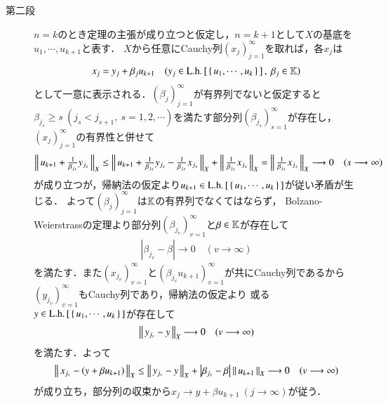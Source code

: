 \begin{prf}
\begin{description}
			\item[第二段]
				$n=k$のとき定理の主張が成り立つと仮定し，$n = k+1$として$X$の基底を$u_1,\cdots,u_{k+1}$と表す．
				$X$から任意にCauchy列$(x_j)_{j=1}^{\infty}$を取れば，各$x_j$は
				\begin{align}
					x_j = y_j + \beta_j u_{k+1} \quad (y_j \in \mathrm{L.h.}\left[\, \left\{\, u_1,\cdots,u_k\, \right\}\, \right],\ \beta_j \in \mathbb{K})
				\end{align}
				として一意に表示される．$(\beta_j)_{j=1}^{\infty}$が有界列でないと仮定すると
				$\beta_{j_s} \geq s\ (j_s < j_{s+1},\ s=1,2,\cdots)$を満たす部分列$\left( \beta_{j_s} \right)_{s=1}^{\infty}$が存在し，
				$(x_j)_{j=1}^{\infty}$の有界性と併せて
				\begin{align}
					\left\|\, u_{k+1} + \tfrac{1}{\beta_{j_s}}y_{j_s}\, \right\|_{X}
					\leq \left\|\, u_{k+1} + \tfrac{1}{\beta_{j_s}}y_{j_s} - \tfrac{1}{\beta_{j_s}}x_{j_s}\, \right\|_{X}
						+ \left\|\, \tfrac{1}{\beta_{j_s}}x_{j_s}\, \right\|_{X}
					= \left\|\, \tfrac{1}{\beta_{j_s}}x_{j_s}\, \right\|_{X} \longrightarrow 0 \quad (s \longrightarrow \infty)
				\end{align}
				が成り立つが，帰納法の仮定より$u_{k+1} \in \mathrm{L.h.}\left[\, \left\{\, u_1,\cdots,u_k\, \right\}\, \right]$が従い矛盾が生じる．
				よって$(\beta_j)_{j=1}^{\infty}$は$\mathbb{K}$の有界列でなくてはならず，
				Bolzano-Weierstrassの定理より部分列$\left( \beta_{j_v} \right)_{v=1}^{\infty}$と$\beta \in \mathbb{K}$が存在して
				\begin{align}
					\left| \beta_{j_v} - \beta \right| \longrightarrow 0 \quad (v \longrightarrow \infty)
				\end{align}
				を満たす．また$\left( x_{j_v} \right)_{v=1}^{\infty}$と$\left( \beta_{j_v} u_{k+1} \right)_{v=1}^{\infty}$が共にCauchy列であるから
				$\left( y_{j_v} \right)_{v=1}^{\infty}$もCauchy列であり，帰納法の仮定より
				或る$y \in \mathrm{L.h.}\left[\, \left\{\, u_1,\cdots,u_k\, \right\}\, \right]$が存在して
				\begin{align}
					\left\|\, y_{j_v} - y\, \right\|_{X} \longrightarrow 0 \quad (v \longrightarrow \infty)
				\end{align}
				を満たす．よって
				\begin{align}
					\left\|\, x_{j_v} - \left(y + \beta u_{k+1}\right)\, \right\|_{X} \leq
					\left\|\, y_{j_v} - y\, \right\|_{X} + \left| \beta_{j_v} - \beta \right| \left\|\, u_{k+1}\, \right\|_{X}
					\longrightarrow 0 \quad (v \longrightarrow \infty)
				\end{align}
				が成り立ち，部分列の収束から$x_j \rightarrow y + \beta u_{k+1}\ (j \rightarrow \infty)$が従う．
				\QED
		\end{description}
	\end{prf}
	
